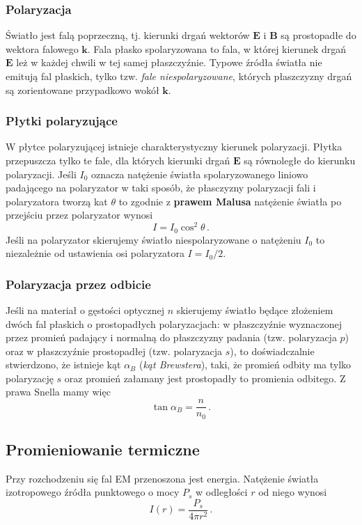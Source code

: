 \documentclass[../main.tex]{subfiles}
\begin{document}
\subsubsection{Polaryzacja}
Światło jest falą poprzeczną, tj. kierunki drgań wektorów \(\mathbf{E}\) i \(\mathbf{B}\) są prostopadłe do wektora falowego \(\mathbf{k}\). Fala płasko spolaryzowana to fala, w której kierunek drgań \(\mathbf{E}\) leż w każdej chwili w tej samej płaszczyźnie. Typowe źródła światła nie emitują fal płaskich, tylko tzw. \textit{fale niespolaryzowane}, których płaszczyzny drgań są zorientowane przypadkowo wokół \(\mathbf{k}\).
\subsubsection*{Płytki polaryzujące}
W płytce polaryzującej istnieje charakterystyczny kierunek polaryzacji. Płytka przepuszcza tylko te fale, dla których kierunki drgań \(\mathbf{E}\) są równoległe do kierunku polaryzacji. Jeśli \(I_0\) oznacza natężenie światła spolaryzowanego liniowo padającego na polaryzator w taki sposób, że płasczyzny polaryzacji fali i polaryzatora tworzą kat \(\theta\) to zgodnie z \textbf{prawem Malusa} natężenie światła po przejściu przez polaryzator wynosi
\begin{equation*}
    I=I_0\cos^2\theta\,.
\end{equation*}
Jeśli na polaryzator skierujemy światło niespolaryzowane o natężeniu \(I_0\) to niezależnie od ustawienia osi polaryzatora \(I=I_0/2\).
\subsubsection*{Polaryzacja przez odbicie}
Jeśli na materiał o gęstości optycznej \(n\) skierujemy światło będące złożeniem dwóch fal płaskich o prostopadłych polaryzacjach: w płaszczyźnie wyznaczonej przez promień padający i normalną do płaszczyzny padania (tzw. polaryzacja \(p\)) oraz w płaszczyźnie prostopadłej (tzw. polaryzacja \(s\)), to doświadczalnie stwierdzono, że istnieje kąt \(\alpha_B\) (\textit{kąt Brewstera}), taki, że promień odbity ma tylko polaryzację \(s\) oraz promień załamany jest prostopadły to promienia odbitego. Z prawa Snella mamy więc
\begin{equation*}
    \tan\alpha_B=\frac{n}{n_0}\,.
\end{equation*}

\subsection{Promieniowanie termiczne}
Przy rozchodzeniu się fal EM przenoszona jest energia. Natężenie światła izotropowego źródła punktowego o mocy \(P_s\) w odległości \(r\) od niego wynosi
\begin{equation*}
    I(r)=\frac{P_s}{4\pi r^2}\,.
\end{equation*}
\end{document}
